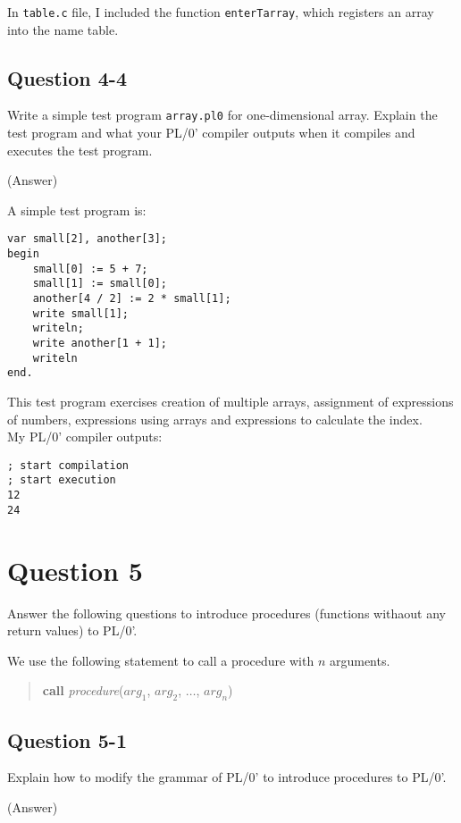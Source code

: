 \documentclass{article}
\begin{document}
In {\tt table.c} file, I included the function {\tt enterTarray}, which
registers an array into the name table.\\

\subsection*{Question 4-4}
Write a simple test program {\tt array.pl0} for one-dimensional array.
Explain the test program and what your PL/0' compiler outputs when it
compiles and executes the test program.

\ifreport
(Answer)\\
\fi

A simple test program is:

\begin{verbatim}
var small[2], another[3];
begin
    small[0] := 5 + 7;
    small[1] := small[0];
    another[4 / 2] := 2 * small[1];
    write small[1];
    writeln;
    write another[1 + 1];
    writeln
end.
\end{verbatim}

This test program exercises creation of multiple arrays, assignment of
expressions of numbers, expressions using arrays and expressions to calculate
the index.\\
My PL/0' compiler outputs:
\begin{verbatim}
; start compilation
; start execution
12 
24
\end{verbatim}

\newpage
\section*{Question 5}
Answer the following questions to introduce procedures (functions withaout any return values) to PL/0'.

We use the following statement to call a procedure with $n$ arguments.
\begin{quote}
 {\bf call} {\it procedure}($arg_1$, $arg_2$, $\dots$, $arg_n$)
\end{quote}


\subsection*{Question 5-1}
Explain how to modify the grammar of PL/0' to introduce procedures to PL/0'.

\ifreport
(Answer)\\
\fi
\end{document}
